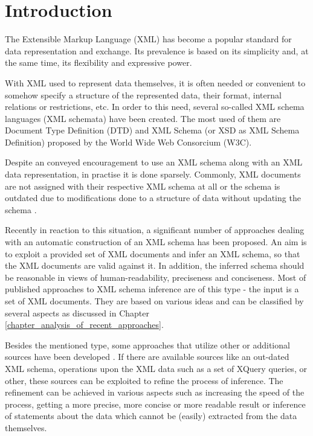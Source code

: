 \chapter{Introduction}
The Extensible Markup Language (XML) \cite{Bray:08:EML} has become a popular standard for data representation and exchange. Its prevalence is based on its simplicity and, at the same time, its flexibility and expressive power.

With XML used to represent data themselves, it is often needed or convenient to somehow specify a structure of the represented data, their format, internal relations or restrictions, etc. In order to this need, several so-called XML schema languages (XML schemata) have been created. The most used of them are Document Type Definition (DTD) \cite{Bray:08:EML} and XML Schema (or XSD as XML Schema Definition) \cite{Walmsley:04:XSP, Thompson:04:XSP, Malhotra:04:XSP} proposed by the World Wide Web Consorcium (W3C).

Despite an conveyed encouragement to use an XML schema along with an XML data representation, in practise it is done sparsely. Commonly, XML documents are not assigned with their respective XML schema at all or the schema is outdated due to modifications done to a structure of data without updating the schema \cite{Mlynkova:2008:AAX:1494650.1495496}.

Recently in reaction to this situation, a significant number of approaches dealing with an automatic construction of an XML schema has been proposed. An aim is to exploit a provided set of XML documents and infer an XML schema, so that the XML documents are valid against it. In addition, the inferred schema should be reasonable in views of human-readability, preciseness and conciseness. Most of published approaches to XML schema inference are of this type - the input is a set of XML documents. They are based on various ideas and can be classified by several aspects as discussed in Chapter \ref{chapter_analysis_of_recent_approaches}.

Besides the mentioned type, some approaches that utilize other or additional sources have been developed . If there are available sources like an out-dated XML schema, operations upon the XML data such as a set of XQuery  queries, or other, these sources can be exploited to refine the process of inference. The refinement can be achieved in various aspects such as increasing the speed of the process, getting a more precise, more concise or more readable result or inference of statements about the data which cannot be (easily) extracted from the data themselves.

